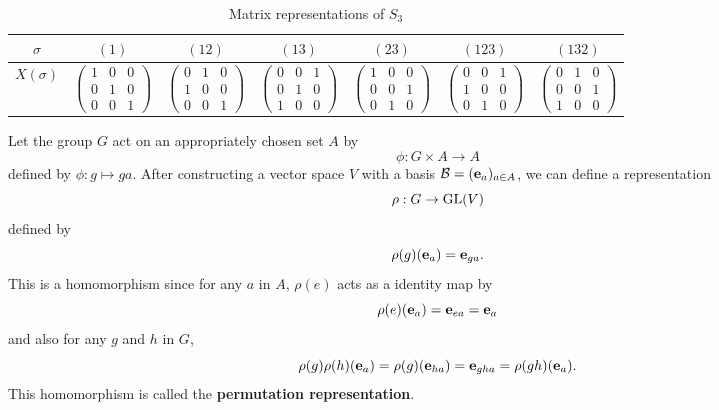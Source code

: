 \begin{example}[$S_n$ for $n = 2,3$]
		\begin{table}[hbt!]
			\centering
			\caption{Matrix representations of $S_3$}
			\begin{tabular}{c | c c c c c c}
				$\sigma$  &$(1)$& $(12)$&$(13)$&$(23)$&$(123)$&$(132)$ \\
				\hline
				$X(\sigma)$ & 
				$\left(\begin{smallmatrix}
					1 & 0 & 0 \\
					0 & 1 & 0 \\
					0 & 0 & 1
				\end{smallmatrix}\right)$ &
				$\left(\begin{smallmatrix}
					0 & 1 & 0 \\
					1 & 0 & 0 \\
					0 & 0 & 1
				\end{smallmatrix}\right)$ &
				$\left(\begin{smallmatrix}
					0 & 0 & 1 \\
					0 & 1 & 0 \\
					1 & 0 & 0
				\end{smallmatrix}\right)$ &
				$\left(\begin{smallmatrix}
					1 & 0 & 0 \\
					0 & 0 & 1 \\
					0 & 1 & 0
				\end{smallmatrix}\right)$ &
				$\left(\begin{smallmatrix}
					0 & 0 & 1 \\
					1 & 0 & 0 \\
					0 & 1 & 0
				\end{smallmatrix}\right)$ &
				$\left(\begin{smallmatrix}
					0 & 1 & 0 \\
					0 & 0 & 1 \\
					1 & 0 & 0
				\end{smallmatrix}\right)$
			\end{tabular}
		\end{table}
		
	\end{example}
	
	Let the group $G$ act on an appropriately chosen set $A$ by
	\[
	\phi : G \times A \rightarrow A
	\] %
	defined by $\phi: g \mapsto ga$. After constructing a vector space $V$ with a basis $\mathcal{B} = ( \mathbf{e}_a )_{a \in A}$, we can define a representation
	\[
	\rho: G \rightarrow \text{GL}(V)
	\]
	defined by
	\[
	\rho(g)(\mathbf{e}_a) = \mathbf{e}_{ga}.
	\]
	This is a homomorphism since for any $a$ in $A$, $\rho(e)$ acts as a identity map by 
	\[
	\rho(e)(\mathbf{e}_a) = \mathbf{e}_{ea} = \mathbf{e}_a
	\]
	and also for any $g$ and $h$ in $G$, 
	\[
	\rho(g)\rho(h)(\mathbf{e}_a) = \rho(g)(\mathbf{e}_{ha}) = \mathbf{e}_{gha} = \rho(gh)(\mathbf{e}_a).
	\]
	This homomorphism is called the \textbf{permutation representation}.
	
